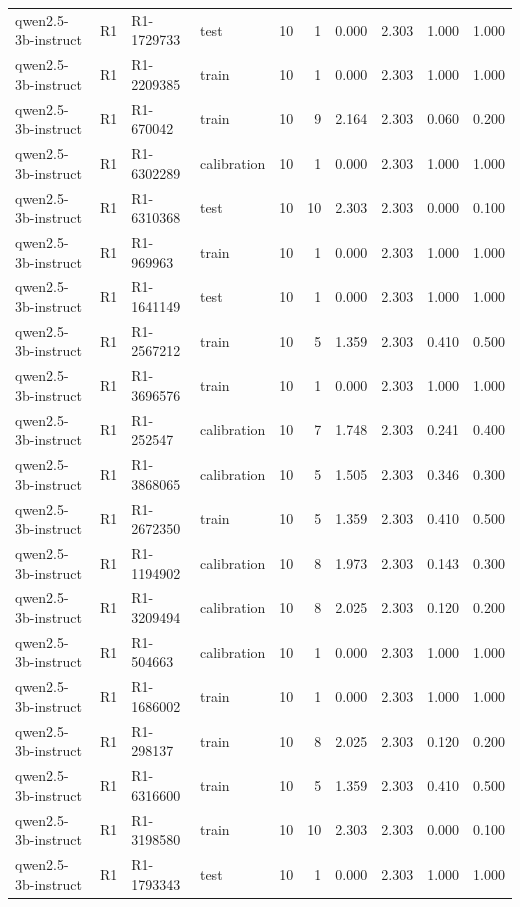 \begin{table}
\begin{tabular}{llllrrrrrr}
qwen2.5-3b-instruct & R1 & R1-1729733 & test & 10 & 1 & 0.000 & 2.303 & 1.000 & 1.000 \\
qwen2.5-3b-instruct & R1 & R1-2209385 & train & 10 & 1 & 0.000 & 2.303 & 1.000 & 1.000 \\
qwen2.5-3b-instruct & R1 & R1-670042 & train & 10 & 9 & 2.164 & 2.303 & 0.060 & 0.200 \\
qwen2.5-3b-instruct & R1 & R1-6302289 & calibration & 10 & 1 & 0.000 & 2.303 & 1.000 & 1.000 \\
qwen2.5-3b-instruct & R1 & R1-6310368 & test & 10 & 10 & 2.303 & 2.303 & 0.000 & 0.100 \\
qwen2.5-3b-instruct & R1 & R1-969963 & train & 10 & 1 & 0.000 & 2.303 & 1.000 & 1.000 \\
qwen2.5-3b-instruct & R1 & R1-1641149 & test & 10 & 1 & 0.000 & 2.303 & 1.000 & 1.000 \\
qwen2.5-3b-instruct & R1 & R1-2567212 & train & 10 & 5 & 1.359 & 2.303 & 0.410 & 0.500 \\
qwen2.5-3b-instruct & R1 & R1-3696576 & train & 10 & 1 & 0.000 & 2.303 & 1.000 & 1.000 \\
qwen2.5-3b-instruct & R1 & R1-252547 & calibration & 10 & 7 & 1.748 & 2.303 & 0.241 & 0.400 \\
qwen2.5-3b-instruct & R1 & R1-3868065 & calibration & 10 & 5 & 1.505 & 2.303 & 0.346 & 0.300 \\
qwen2.5-3b-instruct & R1 & R1-2672350 & train & 10 & 5 & 1.359 & 2.303 & 0.410 & 0.500 \\
qwen2.5-3b-instruct & R1 & R1-1194902 & calibration & 10 & 8 & 1.973 & 2.303 & 0.143 & 0.300 \\
qwen2.5-3b-instruct & R1 & R1-3209494 & calibration & 10 & 8 & 2.025 & 2.303 & 0.120 & 0.200 \\
qwen2.5-3b-instruct & R1 & R1-504663 & calibration & 10 & 1 & 0.000 & 2.303 & 1.000 & 1.000 \\
qwen2.5-3b-instruct & R1 & R1-1686002 & train & 10 & 1 & 0.000 & 2.303 & 1.000 & 1.000 \\
qwen2.5-3b-instruct & R1 & R1-298137 & train & 10 & 8 & 2.025 & 2.303 & 0.120 & 0.200 \\
qwen2.5-3b-instruct & R1 & R1-6316600 & train & 10 & 5 & 1.359 & 2.303 & 0.410 & 0.500 \\
qwen2.5-3b-instruct & R1 & R1-3198580 & train & 10 & 10 & 2.303 & 2.303 & 0.000 & 0.100 \\
qwen2.5-3b-instruct & R1 & R1-1793343 & test & 10 & 1 & 0.000 & 2.303 & 1.000 & 1.000 \\

\end{tabular}
\end{table}
